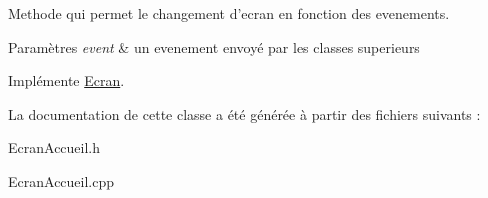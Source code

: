 \-Methode qui permet le changement d'ecran en fonction des evenements. 


\begin{DoxyParams}{\-Paramètres}
{\em event} & un evenement envoyé par les classes superieurs \\
\hline
\end{DoxyParams}


\-Implémente \hyperlink{classEcran}{\-Ecran}.



\-La documentation de cette classe a été générée à partir des fichiers suivants \-:\begin{DoxyCompactItemize}
\item 
\-Ecran\-Accueil.\-h\item 
\-Ecran\-Accueil.\-cpp\end{DoxyCompactItemize}
